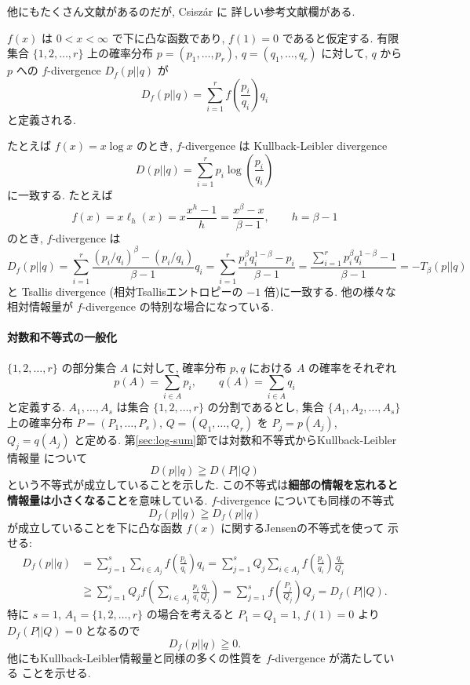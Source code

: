 \documentclass[12pt,twoside]{jarticle}
\theoremstyle{jplain}
\theoremstyle{jplain}
\theoremstyle{jplain}
\numberwithin{theorem}{section}
\numberwithin{equation}{section}
\numberwithin{figure}{section}
\numberwithin{table}{section}
\newcommand\secref[1]{第\ref{#1}節}
\begin{document}
他にもたくさん文献があるのだが, Csisz\'ar \cite{Csiszar2008} に
詳しい参考文献欄がある.

$f(x)$ は $0<x<\infty$ で下に凸な函数であり, $f(1)=0$ であると仮定する.
有限集合 $\{1,2,\ldots,r\}$ 上の確率分布 $p=(p_1,\ldots,p_r)$,
$q=(q_1,\ldots,q_r)$ に対して, $q$ から $p$ への $f$-divergence $D_f(p||q)$ が
\[
D_f(p||q)=\sum_{i=1}^r f\left(\frac{p_i}{q_i}\right)q_i
\]
と定義される. 

たとえば $f(x)=x\log x$ のとき, $f$-divergence は Kullback-Leibler divergence
\[
D(p||q)=\sum_{i=1}^r p_i\log\left(\frac{p_i}{q_i}\right)
\]
に一致する. たとえば
\[
f(x)=x\ell_h(x)=x\frac{x^h-1}{h}=\frac{x^\beta-x}{\beta-1},
\qquad h=\beta-1
\]
のとき, $f$-divergence は
\[
D_f(p||q)
=\sum_{i=1}^r\frac{(p_i/q_i)^\beta-(p_i/q_i)}{\beta-1}q_i
=\sum_{i=1}^r\frac{p_i^\beta q_i^{1-\beta}-p_i}{\beta-1}
=\frac{\sum_{i=1}^r p_i^\beta q_i^{1-\beta}-1}{\beta-1}
=-T_\beta(p||q)
\]
と Tsallis divergence (相対Tsallisエントロピーの $-1$ 倍)に一致する.
他の様々な相対情報量が $f$-divergence の特別な場合になっている.

\paragraph{対数和不等式の一般化}
$\{1,2,\ldots,r\}$ の部分集合 $A$ に対して, 
確率分布 $p,q$ における $A$ の確率をそれぞれ
\[
p(A) = \sum_{i\in A} p_i, \qquad
q(A) = \sum_{i\in A} q_i
\]
と定義する. $A_1,\ldots,A_s$ は集合 $\{1,2,\ldots,r\}$ の分割であるとし, 
集合 $\{A_1,A_2,\ldots,A_s\}$ 上の確率分布
$P=(P_1,\ldots,P_s)$, $Q=(Q_1,\ldots,Q_r)$ を $P_j=p(A_j)$, $Q_j=q(A_j)$ 
と定める. \secref{sec:log-sum}では対数和不等式からKullback-Leibler情報量
について
\[
D(p||q)\geqq D(P||Q)
\]
という不等式が成立していることを示した. 
この不等式は{\bf 細部の情報を忘れると情報量は小さくなること}を意味している.
$f$-divergence についても同様の不等式
\[
D_f(p||q)\geqq D_f(p||q)
\]
が成立していることを下に凸な函数 $f(x)$ に関するJensenの不等式を使って
示せる:
\begin{align*}
D_f(p||q)
&
=\sum_{j=1}^s\sum_{i\in A_j} f\left(\frac{p_i}{q_i}\right)q_i
=\sum_{j=1}^s Q_j \sum_{i\in A_j} f\left(\frac{p_i}{q_i}\right)\frac{q_i}{Q_j}
\\ &
\geqq\sum_{j=1}^s Q_j f\left(\sum_{i\in A_j}\frac{p_i}{q_i}\frac{q_i}{Q_j}\right)
=\sum_{j=1}^s f\left(\frac{P_j}{Q_j}\right)Q_j
=D_f(P||Q).
\end{align*}
特に $s=1$, $A_1=\{1,2,\ldots,r\}$ の場合を考えると $P_1=Q_1=1$, $f(1)=0$
より $D_f(P||Q)=0$ となるので
\[
D_f(p||q)\geqq 0.
\]
他にもKullback-Leibler情報量と同様の多くの性質を $f$-divergence が満たしている
ことを示せる.
\end{document}
